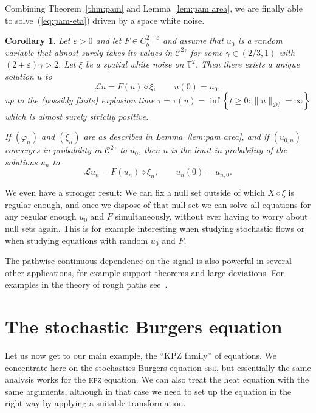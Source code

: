 \documentclass[a4paper,11pt]{article}
\newcommand{\tmname}[1]{\textsc{#1}}
\newtheorem{corollary}{Corollary}
\newcommand{\LL}{\mathscr{L}}
\newcommand{\CC}{\mathscr{C}}
\newcommand{\CD}{\mathscr{D}}
\newcommand{\renorm}{\,\mathord{\diamond}\,}
\begin{document}
Combining Theorem~\ref{thm:pam} and Lemma~\ref{lem:pam area}, we are finally
able to solve~(\ref{eq:pam-eta}) driven by a space white noise.

\begin{corollary}
  Let $\varepsilon > 0$ and let $F \in C^{2 + \varepsilon}_b$ and assume that
  $u_0$ is a random variable that almost surely takes its values in $\CC^{2
  \gamma}$ for some $\gamma \in (2 / 3, 1)$ with $(2 + \varepsilon) \gamma >
  2$. Let $\xi$ be a spatial white noise on $\mathbb{T}^2$. Then there exists
  a unique solution $u$ to
  \[ \LL u = F (u) \renorm \xi, \hspace{2em} u (0) = u_0, \]
  up to the (possibly finite) explosion time $\tau = \tau (u) = \inf \left\{ t
  \geqslant 0 : \| u \|_{\CD^{\gamma}_t} = \infty \right\}$ which is almost
  surely strictly positive.
  
  If $(\varphi_n)$ and $(\xi_n)$ are as described in Lemma~\ref{lem:pam area},
  and if $(u_{0, n})$ converges in probability in $\CC^{2 \gamma}$ to $u_0$,
  then $u$ is the limit in probability of the solutions $u_n$ to
  \[ \LL u_n = F (u_n) \renorm \xi_n, \hspace{2em} u_n (0) = u_{n, 0} . \]
\end{corollary}

\begin{remark}
  We even have a stronger result: We can fix a null set outside of which $X
  \renorm \xi$ is regular enough, and once we dispose of that null set we can
  solve all equations for any regular enough $u_0$ and $F$ simultaneously,
  without ever having to worry about null sets again. This is for example
  interesting when studying stochastic flows or when studying equations with
  random $u_0$ and $F$.
  
  The pathwise continuous dependence on the signal is also powerful in several
  other applications, for example support theorems and large deviations. For
  examples in the theory of rough paths see~{\cite{Friz2010}}.
\end{remark}

\section{The stochastic Burgers equation}\label{sec:rbe}

Let us now get to our main example, the ``KPZ family'' of equations. We
concentrate here on the stochastics Burgers equation {\tmname{sbe}}, but
essentially the same analysis works for the {\tmname{kpz}} equation. We can
also treat the heat equation with the same arguments, although in that case we
need to set up the equation in the right way by applying a suitable
transformation.
\end{document}
